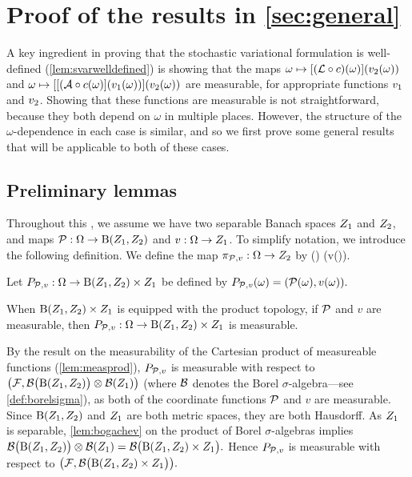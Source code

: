 \section[Proof of the results in Section \MakeLowercase{\ref{sec:general}}]{Proof of the results in \cref{sec:general}}\label{sec:genproof}

A key ingredient in proving that the stochastic variational formulation is well-defined (\cref{lem:svarwelldefined}) is showing that the maps $\omega \mapsto \mleft[\mleft(\rhs\circ\coeff\mright)(\omega)\mright]\mleft(\vt(\omega)\mright)$ and $\omega \mapsto \mleft[\mleft[(\toform\circ\coeff(\omega)\mright]\mleft(\vo(\omega)\mright)\mright]\mleft(\vt(\omega)\mright)$ are measurable, for appropriate functions $v_{1}$ and $v_{2}$. Showing that these functions are measurable is not straightforward, because they both depend on $\omega$ in multiple places. However, the structure of the $\omega$-dependence in each case is similar, and so we first prove some general results that will be applicable to both of these cases.


\subsection{Preliminary lemmas}\label{sec:prelemmanary}
Throughout this , we assume we have two separable Banach spaces $Z_{1}$ and $Z_{2}$, and maps $\Pmap:\Omega\rightarrow \homspaceZoZt$ and $v:\Omega \rightarrow Z_{1}$. To simplify notation, we introduce the following definition.
We define the map $\pi_{\mathcal P,v}:\Omega\rightarrow Z_{2}$ by
\beq\label{eq:comp}
\compPv(\omega) \de \mleft[\Pmap(\omega)\mright]\mleft(v(\omega)\mright).
\eeq
\ede

Let $\toprodPv:\Omega\rightarrow \homspaceZoZt \times \Zo$ be defined by $\toprodPv(\omega) = \mleft(\Pmap(\omega),v(\omega)\mright).$
\ede

\label{lem:Pmeas}
When $\homspaceZoZt \times \Zo$ is equipped with the product topology, if $\mathcal P$ and $v$ are measurable, then $\toprodPv:\Omega\rightarrow \homspaceZoZt\times \Zo$ is measurable.
\ele

By the result on the measurability of the Cartesian product of measureable functions (\cref{lem:measprod}), $P_{\mathcal P,v}$ is measurable with respect to $\big(\cF,\bigBorel{\homspaceZoZt}\otimes \Borel{\Zo}\big)$ (where $\mathcal B$ denotes the Borel $\sigma$-algebra---see \cref{def:borelsigma}), as both of the coordinate functions $\mathcal P$ and $v$ are measurable. Since $\homspaceZoZt$ and $Z_{1}$ are both metric spaces, they are both Hausdorff. As $Z_{1}$ is separable, \cref{lem:bogachev} on the product of Borel $\sigma$-algebras implies $\bigBorel{\homspaceZoZt} \otimes \Borel{\Zo} = \bigBorel{\homspaceZoZt \times \Zo}.$ Hence $P_{\mathcal P,v}$ is measurable with respect to $\big(\cF,\bigBorel{\homspaceZoZt\times \Zo}\big).$
\epf

